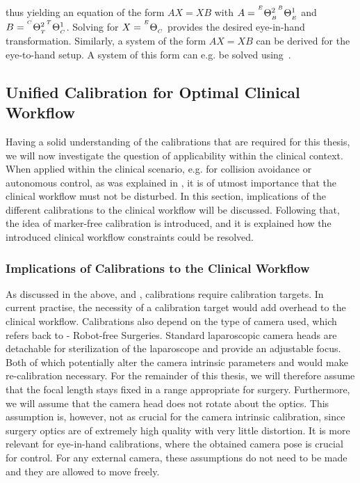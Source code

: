 thus yielding an equation of the form $AX = XB$ with $A={}^{^E}\Theta_{_B}^{2}{}^{^B}\Theta_{_E}^{1}$ and $B={}^{^C}\Theta_{_T}^{2}{}^{^T}\Theta_{_C}^{1}$. Solving for $X={}^{^E}\Theta_{_C}$ provides the desired eye-in-hand transformation. Similarly, a system of the form $AX = XB$ can be derived for the eye-to-hand setup. A system of this form can e.g. be solved using~\cite{tsai1989new, park1994robot, horaud1995hand}.


\subsection{Unified Calibration for Optimal Clinical Workflow}
\label{in:sec:unified_calibration}
Having a solid understanding of the calibrations that are required for this thesis, we will now investigate the question of applicability within the clinical context. When applied within the clinical scenario, e.g. for collision avoidance or autonomous control, as was explained in , it is of utmost importance that the clinical workflow must not be disturbed. In this section, implications of the different calibrations to the clinical workflow will be discussed. Following that, the idea of marker-free calibration is introduced, and it is explained how the introduced clinical workflow constraints could be resolved.

\subsubsection{Implications of Calibrations to the Clinical Workflow}
As discussed in the above,  and , calibrations require calibration targets. In current practise, the necessity of a calibration target would add overhead to the clinical workflow. Calibrations also depend on the type of camera used, which refers back to  - Robot-free Surgeries. Standard laparoscopic camera heads are detachable for sterilization of the laparoscope and provide an adjustable focus. Both of which potentially alter the camera intrinsic parameters and would make re-calibration necessary. For the remainder of this thesis, we will therefore assume that the focal length stays fixed in a range appropriate for surgery. Furthermore, we will assume that the camera head does not rotate about the optics. This assumption is, however, not as crucial for the camera intrinsic calibration, since surgery optics are of extremely high quality with very little distortion. It is more relevant for eye-in-hand calibrations, where the obtained camera pose is crucial for control. For any external camera, these assumptions do not need to be made and they are allowed to move freely.

